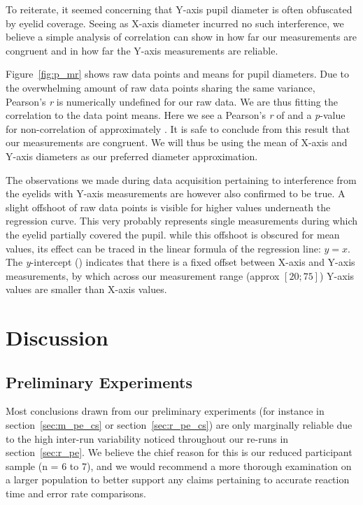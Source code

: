 	    To reiterate, it seemed concerning that Y-axis pupil diameter is often obfuscated by eyelid coverage.
	    Seeing as X-axis diameter incurred no such interference, we believe a simple analysis of correlation can show in how far our measurements are congruent and in how far the Y-axis measurements are reliable.
	    
	    Figure~\ref{fig:p_mr} shows raw data points and means for pupil diameters.
	    Due to the overwhelming amount of raw data points sharing the same variance, Pearson's \textit{r} is numerically undefined for our raw data.
	    We are thus fitting the correlation to the data point means. 
	    Here we see a Pearson's \textit{r} of  and a \textit{p}-value for non-correlation of approximately .
	    It is safe to conclude from this result that our measurements are congruent.
	    We will thus be using the mean of X-axis and Y-axis diameters as our preferred diameter approximation.
	    
	    The observations we made during data acquisition pertaining to interference from the eyelids with Y-axis measurements are however also confirmed to be true.
	    A slight offshoot of raw data points is visible for higher values underneath the regression curve.
	    This very probably represents single measurements during which the eyelid partially covered the pupil.  
	    while this offshoot is obscured for mean values, its effect can be traced in the linear formula of the regression line: 
	    $y = $$x$.
	    The \textit{y}-intercept () indicates that there is a fixed offset between X-axis and Y-axis measurements, by which across our measurement range (approx $[20;75]$) Y-axis values are smaller than X-axis values.
\chapter{Discussion}
    \section{Preliminary Experiments}\label{sec:d_pe}
	Most conclusions drawn from our preliminary experiments (for instance in section~\ref{sec:m_pe_cs} or section~\ref{sec:r_pe_cs}) are only marginally reliable due to the high inter-run variability noticed throughout our re-runs in section~\ref{sec:r_pe}.
	We believe the chief reason for this is our reduced participant sample (n = 6 to 7), and we would recommend a more thorough examination on a larger population to better support any claims pertaining to accurate reaction time and error rate comparisons.
	
